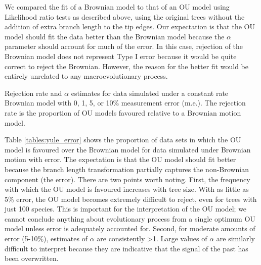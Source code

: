 \documentclass[a4paper,12pt]{article}
\begin{document}
  We compared the fit of a Brownian model to that of an OU model using Likelihood ratio tests as described above, using the original trees without the addition of extra branch length to the tip edges. 
  Our expectation is that the OU model should fit the data better than the Brownian model because the $\alpha$ parameter should account for much of the error. In this case, rejection of the Brownian model does not represent Type I error because it would be quite correct to reject the Brownian. However, the reason for the better fit would be entirely unrelated to any macroevolutionary process. 

    \begin{landscape}
      \begin{table}[!htbp]
        \begin{center}
        \caption{Rejection rate and $\alpha$ estimates for data simulated under a constant rate Brownian model with 0, 1, 5, or 10\% measurement error (m.e.). The rejection rate is the proportion of OU models favoured relative to a Brownian motion model.}
        \bigskip
        
        \label{tables:yule_error}
        \end{center}
\end{table} 
    \end{landscape}

  Table \ref{tables:yule_error} shows the proportion of data sets in which the OU model is favoured over the Brownian model for data simulated under Brownian motion with error. 
  The expectation is that the OU model should fit better because the branch length transformation partially captures the non-Brownian component (the error). There are two points worth noting. 
  First, the frequency with which the OU model is favoured increases with tree size. With as little as 5\% error, the OU model becomes extremely difficult to reject, even for trees with just 100 species. 
  This is important for the interpretation of the OU model; we cannot conclude anything about evolutionary process from a single optimum OU model unless error is adequately accounted for. 
  Second, for moderate amounts of error (5-10\%), estimates of $\alpha$ are consistently \textgreater 1. 
  Large values of $\alpha$ are similarly difficult to interpret because they are indicative that the signal of the past has been overwritten. 
\end{document}

